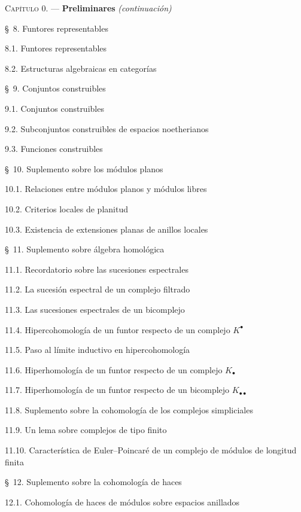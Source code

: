 \begin{flushleft}
\textsc{Capítulo 0.} --- \textbf{Preliminares} \textit{(continuación)} 

\medskip
\S~8. Funtores representables 

8.1. Funtores representables 

8.2. Estructuras algebraicas en categorías 

\medskip
\S~9. Conjuntos construibles 

9.1. Conjuntos construibles 

9.2. Subconjuntos construibles de espacios noetherianos 

9.3. Funciones construibles 

\medskip
\S~10. Suplemento sobre los módulos planos 

10.1. Relaciones entre módulos planos y módulos libres 

10.2. Criterios locales de planitud 

10.3. Existencia de extensiones planas de anillos locales 

\medskip
\S~11. Suplemento sobre álgebra homológica 

11.1. Recordatorio sobre las sucesiones espectrales 

11.2. La sucesión espectral de un complejo filtrado 

11.3. Las sucesiones espectrales de un bicomplejo 

11.4. Hipercohomología de un funtor respecto de un complejo $K^\bullet$

11.5. Paso al límite inductivo en hipercohomología 

11.6. Hiperhomología de un funtor respecto de un complejo $K_\bullet$

11.7. Hiperhomología de un funtor respecto de un bicomplejo
$K_{\bullet\bullet}$ 

11.8. Suplemento sobre la cohomología de los complejos simpliciales 

11.9. Un lema sobre complejos de tipo finito 

11.10. Característica de Euler--Poincaré de un complejo de módulos de longitud finita

\medskip
\S~12. Suplemento sobre la cohomología de haces 

12.1. Cohomología de haces de módulos sobre espacios anillados 


\end{flushleft}
